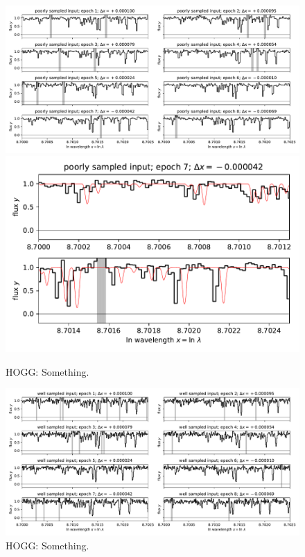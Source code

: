 \documentclass[11pt]{article}
\newlength{\figurewidth}
\begin{document}
\begin{figure}[t!]
    \begin{mdframed}\begin{center}
    \includegraphics[width=1.3\figurewidth]{notebooks/data1.pdf}\\
    \includegraphics[width=\figurewidth]{notebooks/datazoom.pdf}
    \end{center}
    \caption{HOGG: Something.}
    \label{fig:data1}
    \end{mdframed}
\end{figure}
\begin{figure}[t!]
    \begin{mdframed}\begin{center}
    \includegraphics[width=1.3\figurewidth]{notebooks/data2.pdf}
    \end{center}
    \caption{HOGG: Something.}
    \label{fig:data2}
    \end{mdframed}
\end{figure}
\end{document}
